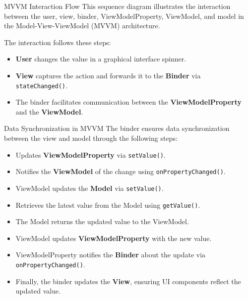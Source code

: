 \documentclass[aspectratio=169, table]{beamer}
\begin{document}
\begin{frame}[fragile]{MVVM Interaction Flow}
	\vspace{20pt}
	This sequence diagram illustrates the interaction between the user, view, binder, ViewModelProperty, ViewModel, and model in the Model-View-ViewModel (MVVM) architecture.
	
	The interaction follows these steps:
	\begin{itemize}
		\item \textbf{User} changes the value in a graphical interface spinner.
		\item \textbf{View} captures the action and forwards it to the \textbf{Binder} via \texttt{stateChanged()}.
		\item The binder facilitates communication between the \textbf{ViewModelProperty} and the \textbf{ViewModel}.
	\end{itemize}
\end{frame}

\begin{frame}[fragile]{Data Synchronization in MVVM}
	\vspace{20pt}
	The binder ensures data synchronization between the view and model through the following steps:
	\begin{itemize}
		\item Updates \textbf{ViewModelProperty} via \texttt{setValue()}.
		\item Notifies the \textbf{ViewModel} of the change using \texttt{onPropertyChanged()}.
		\item ViewModel updates the \textbf{Model} via \texttt{setValue()}.
		\item Retrieves the latest value from the Model using \texttt{getValue()}.
		\item The Model returns the updated value to the ViewModel.
		\item ViewModel updates \textbf{ViewModelProperty} with the new value.
		\item ViewModelProperty notifies the \textbf{Binder} about the update via \texttt{onPropertyChanged()}.
		\item Finally, the binder updates the \textbf{View}, ensuring UI components reflect the updated value.
	\end{itemize}
\end{frame}
\end{document}
